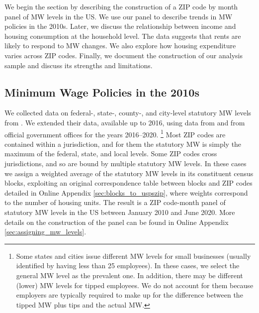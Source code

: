 
We begin the section by describing the construction of a ZIP code by month panel
of MW levels in the US.
We use our panel to describe trends in MW policies in the 2010s.
Later, we discuss the relationship between income and housing consumption at the
household level.
The data suggests that rents are likely to respond to MW changes.
We also explore how housing expenditure varies across ZIP codes.
Finally, we document the construction of our analysis sample and discuss
its strengths and limitations.

\subsection{Minimum Wage Policies in the 2010s}
\label{sec:data_mw_panel}

We collected data on federal-, state-, county-, and city-level statutory MW 
levels from \textcite{VaghulZipperer2016}.
We extended their data, available up to 2016, using data from 
\textcite{BerkeleyLaborCenter} and from official government offices for the 
years 2016--2020.%
\footnote{Some states and cities issue different MW levels for small businesses
    (usually identified by having less than 25 employees).
    In these cases, we select the general MW level as the prevalent one.
    In addition, there may be different (lower) MW levels for tipped employees.
    We do not account for them because employers are typically required to make 
    up for the difference between the tipped MW plus tips and the actual MW.}
%
%
Most ZIP codes are contained within a jurisdiction, and for them the statutory 
MW is simply the maximum of the federal, state, and local levels.
Some ZIP codes cross jurisdictions, and so are bound by multiple statutory MW 
levels.
In these cases we assign a weighted average of the statutory MW levels in its
constituent census blocks, exploiting an original correspondence table between 
blocks and ZIP codes detailed in Online Appendix \ref{sec:blocks_to_uspszip}, 
where weights correspond to the number of housing units.
The result is a ZIP code-month panel of statutory MW levels in the US between
January 2010 and June 2020.
More details on the construction of the panel can be found in Online Appendix 
\ref{sec:assigning_mw_levels}.


